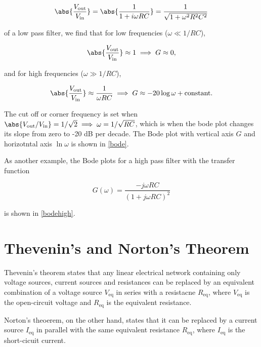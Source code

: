 \documentclass[english,a4paper,12pt]{report}
\begin{document}
\begin{equation}
    \abs{\frac{V_{\text{out} } }{V_{\text{in} } } }  = \abs{\frac{1}{1+i \omega RC} } = \frac{1}{\sqrt{1+\omega ^2R^2C^2} }  
\end{equation}

of a low pass filter, we find that for low frequencies (\(\omega \ll 1/RC\)), 

\begin{equation}
    \abs{\frac{V_{\text{out} } }{V_{\text{in} } } }  \approx 1 \implies  G \approx 0,
\end{equation}

and for high frequencies (\(\omega \gg 1/RC \)), 

\begin{equation}
    \abs{\frac{V_{\text{out} } }{V_{\text{in} } } }  \approx \frac{1}{\omega RC}  \implies G \approx -20\log \omega + \text{constant} .
\end{equation}

The cut off or corner frequency is set when \(\abs{V_{\text{out} } / V_{\text{in} } } = 1/\sqrt{2} \implies \omega = 1/\sqrt{RC}   \), which is when the bode plot changes its slope from zero to -20 dB per decade. The Bode plot with vertical axis \(G\) and horizotntal axis \(\ln \omega \) is shown in \cref{bode}.


As another example, the Bode plots for a high pass filter with the transfer function 

\begin{equation}
    G(\omega ) = \frac{-j \omega RC}{(1+j\omega RC)^2} 
\end{equation}

is shown in \cref{bodehigh}.


\section{Thevenin's and Norton's Theorem}

Thevenin's theorem states that any linear electrical network containing only voltage sources, current sources and resistances can be replaced by an equivalent combination of a voltage source \(V_{\text{eq} } \) in series with a resistacne \(R_{\text{eq} } \), where \(V_{\text{eq} } \) is the open-circuit voltage and \(R_{\text{eq} } \) is the equivalent resistance.

Norton's theoerem, on the other hand, states that it can be replaced by a current source \(I_{\text{eq} } \) in parallel with the same equivalent resistance \(R_{\text{eq} } \), where \(I_{\text{eq} } \) is the short-cicuit current.
\end{document}
